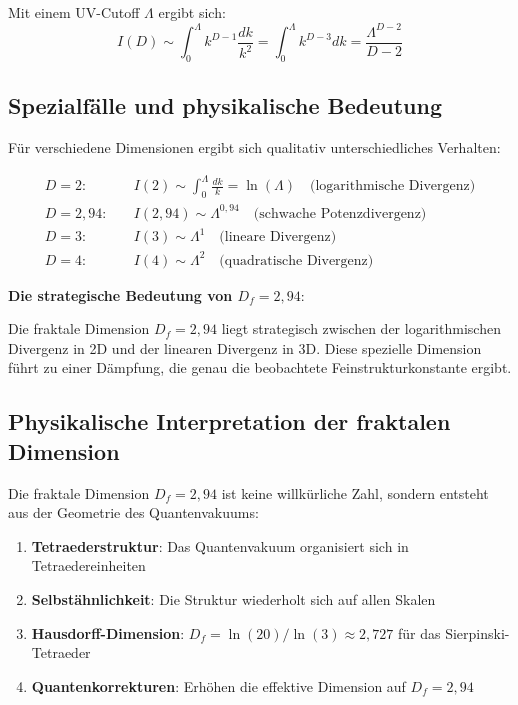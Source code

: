 \documentclass[12pt,a4paper]{article}
\begin{document}
Mit einem UV-Cutoff $\Lambda$ ergibt sich:
\begin{equation}
	I(D) \sim \int_0^{\Lambda} k^{D-1} \frac{dk}{k^2} = \int_0^{\Lambda} k^{D-3} dk = \frac{\Lambda^{D-2}}{D-2}
\end{equation}

\subsection{Spezialfälle und physikalische Bedeutung}

Für verschiedene Dimensionen ergibt sich qualitativ unterschiedliches Verhalten:

\begin{align}
	D = 2: \quad &I(2) \sim \int_0^{\Lambda} \frac{dk}{k} = \ln(\Lambda) \quad \text{(logarithmische Divergenz)}\\
	D = 2{,}94: \quad &I(2{,}94) \sim \Lambda^{0{,}94} \quad \text{(schwache Potenzdivergenz)}\\
	D = 3: \quad &I(3) \sim \Lambda^{1} \quad \text{(lineare Divergenz)}\\
	D = 4: \quad &I(4) \sim \Lambda^{2} \quad \text{(quadratische Divergenz)}
\end{align}

\textbf{Die strategische Bedeutung von $D_f = 2{,}94$}:

Die fraktale Dimension $D_f = 2{,}94$ liegt strategisch zwischen der logarithmischen Divergenz in 2D und der linearen Divergenz in 3D. Diese spezielle Dimension führt zu einer Dämpfung, die genau die beobachtete Feinstrukturkonstante ergibt.

\subsection{Physikalische Interpretation der fraktalen Dimension}

Die fraktale Dimension $D_f = 2{,}94$ ist keine willkürliche Zahl, sondern entsteht aus der Geometrie des Quantenvakuums:

\begin{enumerate}
	\item \textbf{Tetraederstruktur}: Das Quantenvakuum organisiert sich in Tetraedereinheiten
	\item \textbf{Selbstähnlichkeit}: Die Struktur wiederholt sich auf allen Skalen
	\item \textbf{Hausdorff-Dimension}: $D_f = \ln(20)/\ln(3) \approx 2{,}727$ für das Sierpinski-Tetraeder
	\item \textbf{Quantenkorrekturen}: Erhöhen die effektive Dimension auf $D_f = 2{,}94$
\end{enumerate}
\end{document}
